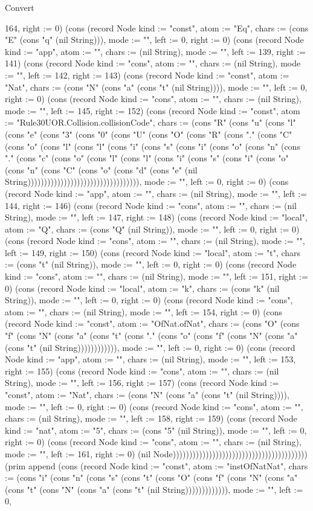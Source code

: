 \begin{lexlean}{Convert}
\begin{semanticmodule}
{164, right := 0}) (cons (record Node {kind := "const", atom := "Eq", chars := (cons "E" (cons "q" (nil String))), mode := "", left := 0, right := 0}) (cons (record Node {kind := "app", atom := "", chars := (nil String), mode := "", left := 139, right := 141}) (cons (record Node {kind := "cons", atom := "", chars := (nil String), mode := "", left := 142, right := 143}) (cons (record Node {kind := "const", atom := "Nat", chars := (cons "N" (cons "a" (cons "t" (nil String)))), mode := "", left := 0, right := 0}) (cons (record Node {kind := "cons", atom := "", chars := (nil String), mode := "", left := 145, right := 152}) (cons (record Node {kind := "const", atom := "Rule30UOR.Collision.collisionCode", chars := (cons "R" (cons "u" (cons "l" (cons "e" (cons "3" (cons "0" (cons "U" (cons "O" (cons "R" (cons "." (cons "C" (cons "o" (cons "l" (cons "l" (cons "i" (cons "s" (cons "i" (cons "o" (cons "n" (cons "." (cons "c" (cons "o" (cons "l" (cons "l" (cons "i" (cons "s" (cons "i" (cons "o" (cons "n" (cons "C" (cons "o" (cons "d" (cons "e" (nil String)))))))))))))))))))))))))))))))))), mode := "", left := 0, right := 0}) (cons (record Node {kind := "app", atom := "", chars := (nil String), mode := "", left := 144, right := 146}) (cons (record Node {kind := "cons", atom := "", chars := (nil String), mode := "", left := 147, right := 148}) (cons (record Node {kind := "local", atom := "Q", chars := (cons "Q" (nil String)), mode := "", left := 0, right := 0}) (cons (record Node {kind := "cons", atom := "", chars := (nil String), mode := "", left := 149, right := 150}) (cons (record Node {kind := "local", atom := "t", chars := (cons "t" (nil String)), mode := "", left := 0, right := 0}) (cons (record Node {kind := "cons", atom := "", chars := (nil String), mode := "", left := 151, right := 0}) (cons (record Node {kind := "local", atom := "k", chars := (cons "k" (nil String)), mode := "", left := 0, right := 0}) (cons (record Node {kind := "cons", atom := "", chars := (nil String), mode := "", left := 154, right := 0}) (cons (record Node {kind := "const", atom := "OfNat.ofNat", chars := (cons "O" (cons "f" (cons "N" (cons "a" (cons "t" (cons "." (cons "o" (cons "f" (cons "N" (cons "a" (cons "t" (nil String)))))))))))), mode := "", left := 0, right := 0}) (cons (record Node {kind := "app", atom := "", chars := (nil String), mode := "", left := 153, right := 155}) (cons (record Node {kind := "cons", atom := "", chars := (nil String), mode := "", left := 156, right := 157}) (cons (record Node {kind := "const", atom := "Nat", chars := (cons "N" (cons "a" (cons "t" (nil String)))), mode := "", left := 0, right := 0}) (cons (record Node {kind := "cons", atom := "", chars := (nil String), mode := "", left := 158, right := 159}) (cons (record Node {kind := "nat", atom := "5", chars := (cons "5" (nil String)), mode := "", left := 0, right := 0}) (cons (record Node {kind := "cons", atom := "", chars := (nil String), mode := "", left := 161, right := 0}) (nil Node))))))))))))))))))))))))))))))))))))))))) (prim append (cons (record Node {kind := "const", atom := "instOfNatNat", chars := (cons "i" (cons "n" (cons "s" (cons "t" (cons "O" (cons "f" (cons "N" (cons "a" (cons "t" (cons "N" (cons "a" (cons "t" (nil String))))))))))))), mode := "", left := 0, }
\end{semanticmodule}
\end{lexlean}

